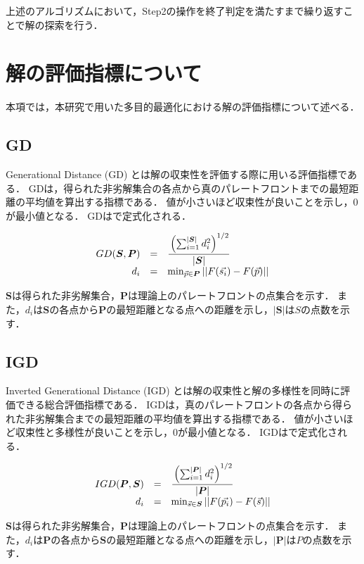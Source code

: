 \documentclass[../main/main]{subfiles}
\begin{document}
上述のアルゴリズムにおいて，Step2の操作を終了判定を満たすまで繰り返すことで解の探索を行う．


\section{解の評価指標について}
\quad 本項では，本研究で用いた多目的最適化における解の評価指標について述べる．

\subsection{GD}
Generational Distance (GD)\cite{Deb2002Fast} とは解の収束性を評価する際に用いる評価指標である．
GDは，得られた非劣解集合の各点から真のパレートフロントまでの最短距離の平均値を算出する指標である．
値が小さいほど収束性が良いことを示し，0が最小値となる．
GDはで定式化される．

\begin{eqnarray}
\begin{array}{rcl}
GD(\bm S,\bm P)&=&\cfrac{\left( \sum^{|\bm S|}_{i=1} d_i^2 \right) ^ {1/2}}{|\bm S|}\\
d_i & = & \min_{\vec p \in \bm P} || F(\vec{s_i}) - F(\vec p) ||
\label{gd_formulation}
\end{array}
\end{eqnarray}

$\bm S$は得られた非劣解集合，$\bm P$は理論上のパレートフロントの点集合を示す．
また，$d_i$は$\bm S$の各点から$\bm P$の最短距離となる点への距離を示し，$|\bm S|$は$S$の点数を示す．


\subsection{IGD}
Inverted Generational Distance (IGD)\cite{Zhou2006combining} とは解の収束性と解の多様性を同時に評価できる総合評価指標である．
IGDは，真のパレートフロントの各点から得られた非劣解集合までの最短距離の平均値を算出する指標である．
値が小さいほど収束性と多様性が良いことを示し，0が最小値となる．
IGDはで定式化される．

\begin{eqnarray}
\begin{array}{rcl}
IGD(\bm P,\bm S)&=&\cfrac{\left( \sum^{|\bm P|}_{i=1} d_i^2 \right) ^ {1/2}}{|\bm P|}\\
d_i & = & \min_{\vec s \in \bm S} || F(\vec{p_i}) - F(\vec s) ||
\label{igd_formulation}
\end{array}
\end{eqnarray}

$\bm S$は得られた非劣解集合，$\bm P$は理論上のパレートフロントの点集合を示す．
また，$d_i$は$\bm P$の各点から$\bm S$の最短距離となる点への距離を示し，$|\bm P|$は$P$の点数を示す．
\end{document}
